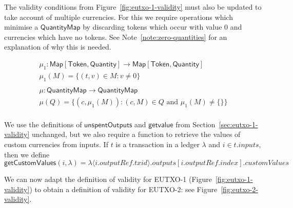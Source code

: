 \documentclass[a4paper]{article}
\newcounter{note}
\newcommand{\s}{\textsf}  %
\newcommand{\Map}[2]{\ensuremath{\s{Map}[#1,#2]}}
\newcommand{\mi}[1]{\ensuremath{\mathit{#1}}}
\newcommand{\txid}{\mi{txid}}
\newcommand{\idx}{\mi{index}}
\newcommand{\inputs}{\mi{inputs}}
\newcommand{\outputs}{\mi{outputs}}
\newcommand{\customvals}{\mi{customValues}}
\newcommand{\outputref}{\mi{outputRef}}
\newcommand{\getvalue}{\msf{getvalue}}
\newcommand{\msf}[1]{\ensuremath{\mathsf{#1}}}
\newcommand{\unspent}{\msf{unspentOutputs}}
\newcommand{\qty}{\ensuremath{\s{Quantity}}}
\newcommand{\token}{\ensuremath{\s{Token}}}
\newcommand{\qtymap}{\ensuremath{\s{QuantityMap}}}
\begin{document}
\bigskip
\noindent The validity conditions from
Figure~\ref{fig:eutxo-1-validity} must also be updated to take account
of multiple currencies.  For this we require operations which minimise
a $\qtymap$ by discarding tokens which occur with value 0 and currencies
which have no tokens.  See Note~\ref{note:zero-quantities} for an explanation
of why this is needed.

\begin{gather*}
  \mu_1: \Map{\token}{\qty} \rightarrow \Map{\token}{\qty} \\
  \mu_1(M) = \{(t,v) \in M: v \ne 0\}\\
  \\
  \mu: \qtymap  \rightarrow \qtymap\\
  \mu(Q) = \{(c,\mu_1(M)): (c,M) \in Q \mbox{ and } \mu_1(M) \ne \{\}\}\\
\end{gather*}

\newcommand{\mprime}{M^{\prime}}

We use the definitions of \unspent{}  and
\getvalue{} from Section~\ref{sec:eutxo-1-validity} unchanged,
but we also require a function to retrieve the values of
custom currencies from inputs. If $t$ is a transaction in a ledger
$\lambda$ and $i \in t.\inputs$, then we define
$$
\s{getCustomValues}(i,\lambda) = \lambda\langle i.\outputref.\txid
\rangle.\outputs[i.\outputref.\idx].\customvals
$$

We can now adapt the definition of validity for EUTXO-1
(Figure~\ref{fig:eutxo-1-validity}) to obtain a definition of validity for
EUTXO-2: see Figure~\ref{fig:eutxo-2-validity}.
\end{document}
